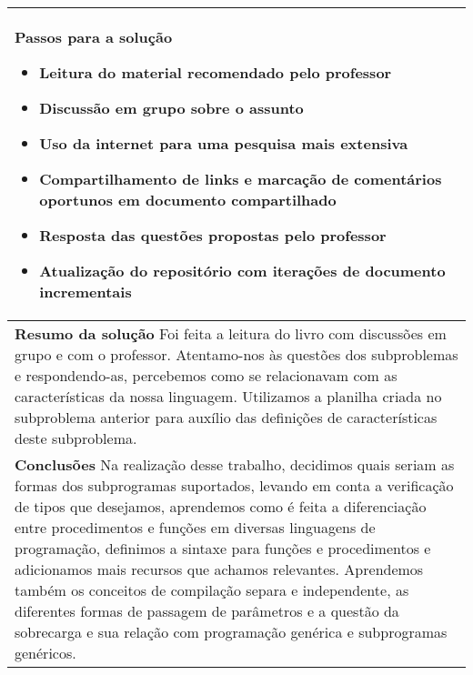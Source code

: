 \documentclass[12pt, a4paper]{article}
\begin{document}
\begin{longtabu}{| X |}
    \textbf{Passos para a solução} \newline
    \begin{minipage}[t]{\linewidth}
    \begin{itemize}[itemsep=.5ex,parsep=.0ex,after=\strut,leftmargin=15pt]
        \item
        Leitura do material recomendado pelo professor
        \item
        Discussão em grupo sobre o assunto
        \item
        Uso da internet para uma pesquisa mais extensiva
        \item
        Compartilhamento de links e marcação de comentários oportunos em
        documento compartilhado
        \item
        Resposta das questões propostas pelo professor
        \item
        Atualização do repositório com iterações de documento incrementais
    \end{itemize}
    \end{minipage}
    \\ \hline

    \textbf{Resumo da solução} \newline
    Foi feita a leitura do livro com discussões em grupo e com o professor.
    Atentamo-nos às questões dos subproblemas e respondendo-as, percebemos como
    se relacionavam com as características da nossa linguagem. Utilizamos a
    planilha criada no subproblema anterior para auxílio das definições de
    características deste subproblema.
    \\ \hline

    \textbf{Conclusões} \newline
    Na realização desse trabalho, decidimos quais seriam as formas dos
    subprogramas suportados, levando em conta a verificação de tipos que
    desejamos, aprendemos como é feita a diferenciação entre procedimentos e
    funções em diversas linguagens de programação, definimos a sintaxe para
    funções e procedimentos e adicionamos mais recursos que achamos
    relevantes. Aprendemos também os conceitos de compilação separa e
    independente, as diferentes formas de passagem de parâmetros e a questão da
    sobrecarga e sua relação com programação genérica e subprogramas genéricos.
    \\ \hline

\end{longtabu}
\end{document}
